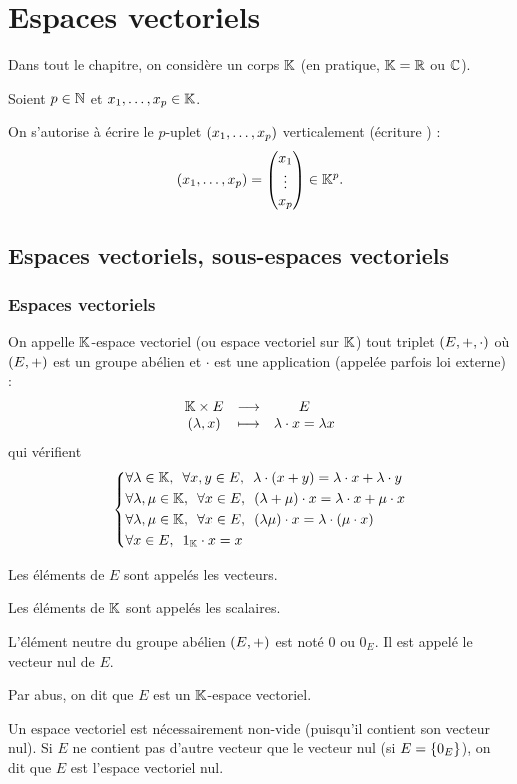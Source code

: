 \chapter{Espaces vectoriels}

\minitoc

Dans tout le chapitre, on considère un corps \(\mathbb{K}\) (en pratique, \(\mathbb{K}=\mathbb{R}\) ou \(\mathbb{C}\)).

\begin{nota}
Soient \(p\in\mathbb{N}\) et \(x_1,\dots,x_p\in\mathbb{K}\).

On s'autorise à écrire le \(p\)-uplet \(\left(x_1,\dots,x_p\right)\) verticalement (écriture ) : \[\left(x_1,\dots,x_p\right)=\begin{pmatrix}x_1 \\ \vdots \\ x_p\end{pmatrix}\in\mathbb{K}^p.\]
\end{nota}

\section{Espaces vectoriels, sous-espaces vectoriels}

\subsection{Espaces vectoriels}

\begin{defi}
On appelle \(\mathbb{K}\)-espace vectoriel (ou espace vectoriel sur \(\mathbb{K}\)) tout triplet \(\corps{E}[+][\cdot]\) où \(\groupe{E}\) est un groupe abélien et \(\cdot\) est une application (appelée parfois loi externe) : \[\begin{array}[t]{ccc}\mathbb{K}\times E & \longrightarrow & E \\ \left(\lambda,x\right) & \longmapsto & \lambda\cdot x=\lambda x\end{array}\] qui vérifient \[\begin{dcases}\quantifs{\forall\lambda\in\K;\forall x,y\in E}\lambda\cdot\paren{x+y}=\lambda\cdot x+\lambda\cdot y \\ \quantifs{\forall\lambda,\mu\in\K;\forall x\in E}\paren{\lambda+\mu}\cdot x=\lambda\cdot x+\mu\cdot x \\ \quantifs{\forall\lambda,\mu\in\K;\forall x\in E}\paren{\lambda\mu}\cdot x=\lambda\cdot\paren{\mu\cdot x} \\ \quantifs{\forall x\in E}1_\K\cdot x=x\end{dcases}\]

Les éléments de \(E\) sont appelés les vecteurs.

Les éléments de \(\mathbb{K}\) sont appelés les scalaires.

L'élément neutre du groupe abélien \(\groupe{E}\) est noté \(0\) ou \(0_E\). Il est appelé le vecteur nul de \(E\).

Par abus, on dit que \(E\) est un \(\mathbb{K}\)-espace vectoriel.

Un espace vectoriel est nécessairement non-vide (puisqu'il contient son vecteur nul). Si \(E\) ne contient pas d'autre vecteur que le vecteur nul (\cad si \(E=\left\lbrace0_E\right\rbrace\)), on dit que \(E\) est l'espace vectoriel nul.
\end{defi}

